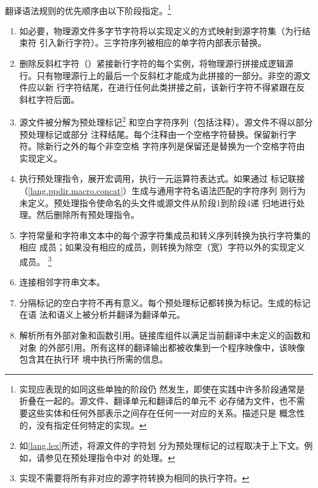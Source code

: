 \paragraph{}
翻译语法规则的优先顺序由以下阶段指定。\footnote{实现应表现的如同这些单独的阶段仍
然发生，即使在实践中许多阶段通常是折叠在一起的。源文件、翻译单元和翻译后的单元不
必存储为文件，也不需要这些实体和任何外部表示之间存在任何一一对应的关系。描述只是
概念性的，没有指定任何特定的实现。}
\begin{enumerate}
  \item{如必要，物理源文件多字节字符将以实现定义的方式映射到源字符集（为行结束符
    引入新行字符）。三字符序列被相应的单字符内部表示替换。}
  \item{删除反斜杠字符（\tm{\bs}）紧接新行字符的每个实例，将物理源行拼接成逻辑源
    行。只有物理源行上的最后一个反斜杠才能成为此拼接的一部分。非空的源文件应以新
    行字符结尾，在进行任何此类拼接之前，该新行字符不得紧跟在反斜杠字符后面。}
  \item{源文件被分解为预处理标记\footnote{如\ref{lang.lex}所述，将源文件的字符划
    分为预处理标记的过程取决于上下文。例如，请参见在预处理指令中对
    \tm{<}的处理。} 和空白字符序列（包括注释）。源文件不得以部分预处理标记或部分
    注释结尾。每个注释由一个空格字符替换。保留新行字符。除新行之外的每个非空空格
    字符序列是保留还是替换为一个空格字符由实现定义。}
  \item{执行预处理指令，展开宏调用，执行一元运算符表达式。如果通过
    标记联接（\ref{lang.ppdir.macro.concat}）生成与通用字符名语法匹配的字符序列
    则行为未定义。预处理指令使命名的头文件或源文件从阶段1到阶段4递
    归地进行处理。然后删除所有预处理指令。}
  \item{字符常量和字符串文本中的每个源字符集成员和转义序列转换为执行字符集的相应
    成员；如果没有相应的成员，则转换为除空（宽）字符以外的实现定义成员。
    \footnote{实现不需要将所有非对应的源字符转换为相同的执行字符。}}
  \item{连接相邻字符串文本。}
  \item{分隔标记的空白字符不再有意义。每个预处理标记都转换为标记。生成的标记在语
    法和语义上被分析并翻译为翻译单元。}
  \item{解析所有外部对象和函数引用。链接库组件以满足当前翻译中未定义的函数和对象
    的外部引用。所有这样的翻译输出都被收集到一个程序映像中，该映像包含其在执行环
    境中执行所需的信息。}
\end{enumerate}


